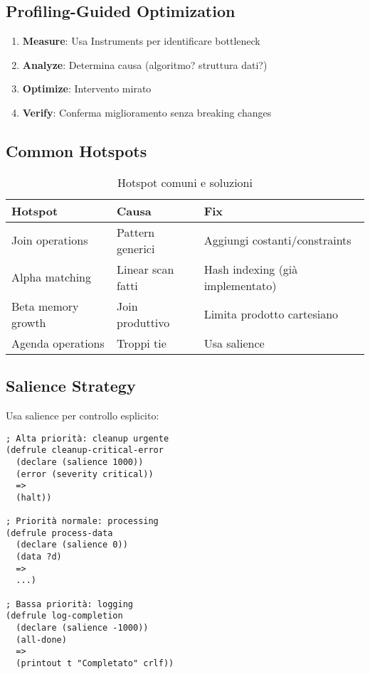 \subsection{Profiling-Guided Optimization}

\begin{enumerate}
\item \textbf{Measure}: Usa Instruments per identificare bottleneck
\item \textbf{Analyze}: Determina causa (algoritmo? struttura dati?)
\item \textbf{Optimize}: Intervento mirato
\item \textbf{Verify}: Conferma miglioramento senza breaking changes
\end{enumerate}

\subsection{Common Hotspots}

\begin{table}[h]
\centering
\begin{tabular}{@{}lll@{}}
\toprule
\textbf{Hotspot} & \textbf{Causa} & \textbf{Fix} \\
\midrule
Join operations & Pattern generici & Aggiungi costanti/constraints \\
Alpha matching & Linear scan fatti & Hash indexing (già implementato) \\
Beta memory growth & Join produttivo & Limita prodotto cartesiano \\
Agenda operations & Troppi tie & Usa salience \\
\bottomrule
\end{tabular}
\caption{Hotspot comuni e soluzioni}
\label{tab:hotspots}
\end{table}

\subsection{Salience Strategy}

Usa salience per controllo esplicito:

\begin{lstlisting}[language=CLIPS]
; Alta priorità: cleanup urgente
(defrule cleanup-critical-error
  (declare (salience 1000))
  (error (severity critical))
  =>
  (halt))

; Priorità normale: processing
(defrule process-data
  (declare (salience 0))
  (data ?d)
  =>
  ...)

; Bassa priorità: logging
(defrule log-completion
  (declare (salience -1000))
  (all-done)
  =>
  (printout t "Completato" crlf))
\end{lstlisting}

